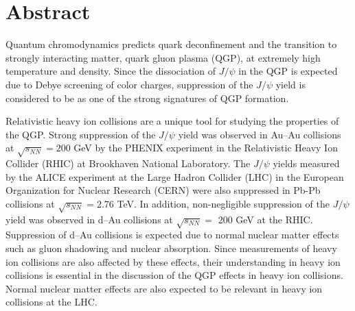 \chapter*{Abstract}
Quantum chromodynamics predicts quark deconfinement and the transition to strongly interacting matter, quark gluon plasma (QGP), at extremely high temperature and density. 
Since the dissociation of $J/\psi$ in the QGP is expected due to Debye screening of color charges, suppression of the $J/\psi$ yield is considered to be as one of the strong signatures of QGP formation. 

Relativistic heavy ion collisions are a unique tool for studying the properties of the QGP. 
Strong suppression of the $J/\psi$ yield was observed in Au--Au collisions at $\sqrt{s_{NN}}=200$ GeV by the PHENIX experiment in the Relativistic Heavy Ion Collider (RHIC) at Brookhaven National Laboratory.
The $J/\psi$ yields measured by the ALICE experiment at the Large Hadron Collider (LHC) in the European Organization for Nuclear Research (CERN) were also suppressed in Pb-Pb collisions at $\sqrt{s_{NN}}=$2.76 TeV. 
In addition, non-negligible suppression of the $J/\psi$ yield was observed in d--Au collisions at $\sqrt{s_{NN}}=$ 200 GeV at the RHIC.
Suppression of d--Au collisions is expected due to normal nuclear matter effects such as gluon shadowing and nuclear absorption.  
Since measurements of heavy ion collisions are also affected by these effects, their understanding in heavy ion collisions is essential in the discussion of the QGP effects in heavy ion collisions.
Normal nuclear matter effects are also expected to be relevant in heavy ion collisions at the LHC. 

